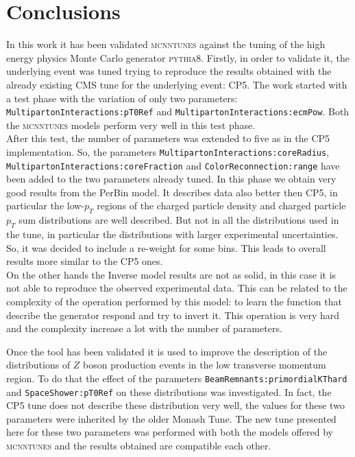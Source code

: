 \chapter*{Conclusions}

In this work it has been validated \textsc{mcnntunes} against the tuning of the high energy physics Monte Carlo generator \textsc{pythia8}. Firstly, in order to validate it, the underlying event was tuned trying to reproduce the results obtained with the already existing CMS tune for the underlying event: CP5. The work started with a test phase with the variation of only two parameters: \texttt{MultipartonInteractions:}\-\texttt{pT0Ref} and \texttt{MultipartonInteractions:}\-\texttt{ecmPow}. Both the \textsc{mcnntunes} models perform very well in this test phase. 
\\
After this test, the number of parameters was extended to five as in the CP5 implementation. So, the parameters \texttt{MultipartonInteractions:}\-\texttt{core}\-\texttt{Radius}, \texttt{MultipartonInteractions:}\-\texttt{core}\-\texttt{Fraction} and \texttt{ColorReconnection:}\-\texttt{range} have been added to the two parameters already tuned. In this phase we obtain very good results from the PerBin model. It describes data also better then CP5, in particular the low-$p_T$ regions of the charged particle density and charged particle $p_T$ sum distributions are well described.  But not in all the distributions used in the tune, in particular the distributions with larger experimental uncertainties. So, it was decided to include a re-weight for some bins. This leads to overall results more similar to the CP5 ones.
\\
On the other hands the Inverse model results are not as solid, in this case it is not able to reproduce the observed experimental data.
This can be related to the complexity of the operation performed by this model: to learn the function that describe the generator respond and try to invert it. This operation is very hard and the complexity increase a lot with the number of parameters.

Once the tool has been validated it is used to improve the description of the distributions of $Z$ boson production events in the low transverse momentum region. To do that the effect of the parameters \texttt{BeamRemnants:}\-\texttt{primordialKT}\-\texttt{hard} and \texttt{SpaceShower:}\-\texttt{pT0Ref} on these distributions was investigated. In fact, the CP5 tune does not describe these distribution very well, the values for these two parameters were inherited by the older Monash Tune. 
The new tune presented here for these two parameters was performed with both the models offered by \textsc{mcnntunes} and the results obtained are compatible each other. 

